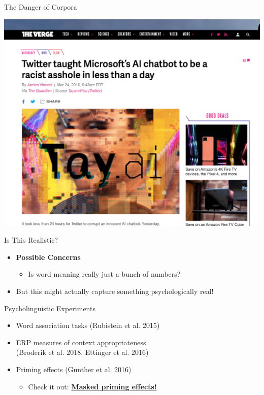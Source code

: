 \documentclass[professionalfonts, xcolor={usenames,svgnames,x11names,table}]{beamer}
\begin{document}
\begin{frame}{The Danger of Corpora}

\begin{center}
        \includegraphics[width=1\linewidth]{./img/bias1}
\end{center}

\end{frame}

\begin{frame}{Is This Realistic?}
    \begin{itemize}
        \item \textbf{Possible Concerns}
            \begin{itemize}
                \item Is word meaning really just a bunch of numbers?
            \end{itemize}
        \item But this might actually capture something psychologically real!
    \end{itemize}
    \begin{block}{Psycholinguistic Experiments}
        \begin{itemize}
            \item Word association tasks (Rubistein et al. 2015)
             \item ERP measures of context appropriateness \\ (Broderik et al. 2018, Ettinger et al. 2016)
              \item  Priming effects (Gunther et al. 2016)
                 \begin{itemize}
               \item Check it out: \href{http://www.u.arizona.edu/~kforster/priming/index.htm}{\textbf{Masked priming effects!}}
       		 \end{itemize}
         \end{itemize}
    \end{block}
\end{frame}
\end{document}
